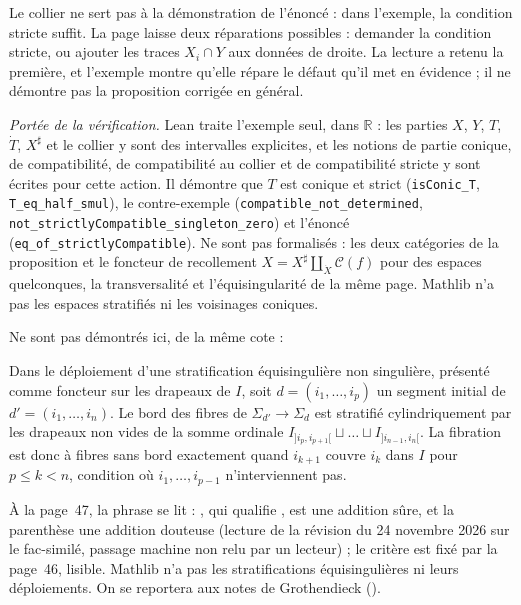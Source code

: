 \begin{remarque}
Le collier ne sert pas à la démonstration de l'énoncé : dans l'exemple, la condition stricte suffit. La page laisse deux réparations possibles : demander la condition stricte, ou ajouter les traces $X_i \cap Y$ aux données de droite. La lecture a retenu la première, et l'exemple montre qu'elle répare le défaut qu'il met en évidence ; il ne démontre pas la proposition corrigée en général.
\end{remarque}

\begingroup\raggedright
\noindent\emph{Portée de la vérification.} Lean traite l'exemple seul, dans $\mathbb R$ : les parties $X$, $Y$, $T$, $\dot T$, $X^\sharp$ et le collier y sont des intervalles explicites, et les notions de partie conique, de compatibilité, de compatibilité au collier et de compatibilité stricte y sont écrites pour cette action. Il démontre que $T$ est conique et strict (\texttt{isConic\_T}, \texttt{T\_eq\_half\_smul}), le contre-exemple (\texttt{compatible\_not\_determined}, \texttt{not\_strictlyCompatible\_singleton\_zero}) et l'énoncé (\texttt{eq\_of\_strictlyCompatible}). Ne sont pas formalisés : les deux catégories de la proposition et le foncteur de recollement $X = X^\sharp \amalg_{\dot X} \mathcal C(f)$ pour des espaces quelconques, la transversalité et l'équisingularité de la même page. Mathlib n'a pas les espaces stratifiés ni les voisinages coniques.\par\endgroup

Ne sont pas démontrés ici, de la même cote :

\begin{encadre}
\begin{theoreme*}\nonverifie
Dans le déploiement d'une stratification équisingulière non singulière, présenté comme foncteur sur les drapeaux de $I$, soit $d = (i_1, \dots, i_p)$ un segment initial de $d' = (i_1, \dots, i_n)$. Le bord des fibres de $\Sigma_{d'} \to \Sigma_d$ est stratifié cylindriquement par les drapeaux non vides de la somme ordinale $I_{]i_p,i_{p+1}[} \sqcup \dots \sqcup I_{]i_{n-1},i_n[}$. La fibration est donc à fibres sans bord exactement quand $i_{k+1}$ couvre $i_k$ dans $I$ pour $p \leq k < n$, condition où $i_1, \dots, i_{p-1}$ n'interviennent pas.
\end{theoreme*}
\end{encadre}
{\small À la page~47, la phrase se lit  : , qui qualifie , est une addition sûre, et la parenthèse une addition douteuse (lecture de la révision du 24 novembre 2026 sur le fac-similé, passage machine non relu par un lecteur) ; le critère est fixé par la page~46, lisible. Mathlib n'a pas les stratifications équisingulières ni leurs déploiements. On se reportera aux notes de Grothendieck ().\par}

